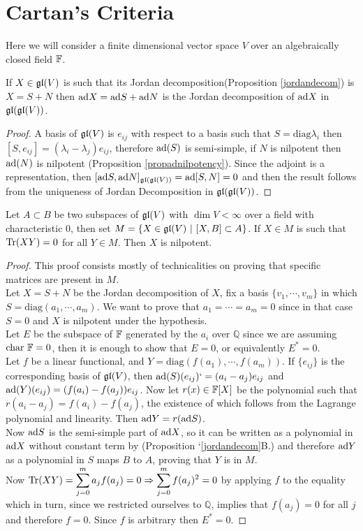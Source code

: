 \section{Cartan's Criteria}
Here we will consider a finite dimensional vector space $V$ over an algebraically closed field $\mathbb{F}$.
\begin{prop}
	If $X \in \mathfrak{gl}(V)$ is such that its Jordan decomposition(Proposition \ref{jordandecom}) is $X=S+N$ then $\text{ad} X = \text{ad} S + \text{ad} N$ is the Jordan decomposition of $\text{ad} X$ in $\mathfrak{gl}(\mathfrak{gl}(V))$.
\end{prop}
\begin{proof}
	A basis of $\mathfrak{gl}(V)$ is $e_{ij}$ with respect to a basis such that $S= \text{diag}{\lambda_i}$ then $[S,e_{ij}]=(\lambda_i-\lambda_j)e_{ij}$, therefore $\text{ad}(S)$ is semi-simple, if $N$ is nilpotent then $\text{ad}(N)$ is nilpotent (Proposition \ref{propadnilpotency}). Since the adjoint is a representation, then $[\text{ad} S,\text{ad} N]_{\mathfrak{gl}(\mathfrak{gl}(V))} = \text{ad}[S,N] = 0$ and then the result follows from the uniqueness of Jordan Decomposition in $\mathfrak{gl}(\mathfrak{gl}(V))$.
\end{proof}
\begin{teo}
	Let $A \subset B$ be two subspaces of $\mathfrak{gl}(V)$ with $\dim V < \infty$ over a field with characteristic $0$, then set $M=\{X \in \mathfrak{gl}(V)\ |\ [X,B]\subset A\}$. If $X \in M$ is such that $\text{Tr}(XY)=0$ for all $Y \in M$. Then $X$ is nilpotent.
	\label{Cartan's Lemma}
\end{teo}
\begin{proof}
	This proof consists mostly of technicalities on proving that specific matrices are present in $M$.\\ 
	Let $X=S+N$ be the Jordan decomposition of $X$, fix a basis $\{v_1,\cdots,v_m\}$ in which $S=\text{diag}(a_1,\cdots,a_m)$. We want to prove that $a_1=\cdots=a_m=0$ since in that case $S=0$ and $X$ is nilpotent under the hypothesis.\\
	Let $E$ be the subspace of $\mathbb{F}$ generated by the $a_i$ over $\mathbb{Q}$ since we are assuming $\text{char } \mathbb{F}= 0$, then it is enough to show that $E=0$, or equivalently $E^*=0$.\\
	Let $f$ be a linear functional, and $Y=\text{diag}(f(a_1),\cdots,f(a_m))$. If $\{e_{ij}\}$ is the corresponding basis of $\mathfrak{gl}(V)$, then $\text{ad}(S)(e_{ij})` = (a_i-a_j)e_{ij}$ and $\text{ad}(Y)(e_{ij}) = (f(a_i)-f(a_j))e_{ij}$. Now let $r(x)\in\mathbb{F}[X]$ be the polynomial such that $r(a_i-a_j)=f(a_i)-f(a_j)$, the existence of which follows from the Lagrange polynomial and linearity. Then $\text{ad} Y = r(\text{ad} S)$.\\
	Now $\text{ad} S$ is the semi-simple part of $\text{ad} X$, so it can be written as a polynomial in $\text{ad} X$ without constant term by (Proposition `\ref{jordandecom}B.) and therefore $\text{ad} Y$ as a polynomial in $S$ maps $B$ to $A$, proving that $Y$ is in $M$.\\
	Now $\text{Tr}(XY)=\displaystyle\sum_{j=0}^m a_jf(a_j)=0 \Rightarrow \displaystyle\sum_{j=0}^m f(a_j)^2 =0$ by applying $f$ to the equality which in turn, since we restricted ourselves to $\mathbb{Q}$, implies that $f(a_j)=0$ for all $j$ and therefore $f=0$. Since $f$ is arbitrary then $E^*=0$.
\end{proof}	\\
